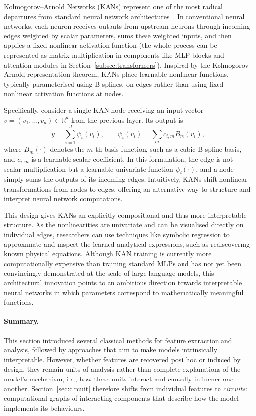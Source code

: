 Kolmogorov--Arnold Networks (KANs) represent one of the most radical departures from standard neural network architectures~. In conventional neural networks, each neuron receives outputs from upstream neurons through incoming edges weighted by scalar parameters, sums these weighted inputs, and then applies a fixed nonlinear activation function (the whole process can be represented as matrix multiplication in components like MLP blocks and attention modules in Section~\ref{subsec:transformers}). Inspired by the Kolmogorov--Arnold representation theorem, KANs place learnable nonlinear functions, typically parameterised using B-splines, on edges rather than using fixed nonlinear activation functions at nodes.

Specifically, consider a single KAN node receiving an input vector
$v = (v_1, \dots, v_d) \in \mathbb{R}^d$ from the previous layer. Its output is
\[
y = \sum_{i=1}^{d} \psi_i(v_i), \qquad \psi_i(v_i) = \sum_{m} c_{i,m} B_m(v_i),
\]
where $B_m(\cdot)$ denotes the $m$-th basis function, such as a cubic B-spline basis,
and $c_{i,m}$ is a learnable scalar coefficient. In this formulation, the edge is not scalar multiplication but a learnable univariate function $\psi_i(\cdot)$, and a node simply sums the outputs of its incoming edges. Intuitively, KANs shift nonlinear transformations from nodes to edges, offering an alternative way to structure and interpret neural network computations.

This design gives KANs an explicitly compositional and thus more interpretable structure. As the nonlinearities are univariate and can be visualised directly on individual edges, researchers can use techniques like symbolic regression to approximate and inspect the learned analytical expressions, such as rediscovering known physical equations. Although KAN training is currently more computationally expensive than training standard MLPs and has not yet been convincingly demonstrated at the scale of large language models, this architectural innovation points to an ambitious direction towards interpretable neural networks in which parameters correspond to mathematically meaningful functions.

\paragraph{Summary.} This section introduced several classical methods for feature extraction and analysis, followed by approaches that aim to make models intrinsically interpretable. However, whether features are recovered post hoc or induced by design, they remain units of analysis rather than complete explanations of the model's mechanism, i.e., how these units interact and causally influence one another. Section~\ref{sec:circuit} therefore shifts from individual features to \emph{circuits}: computational graphs of interacting components that describe how the model implements its behaviours.
